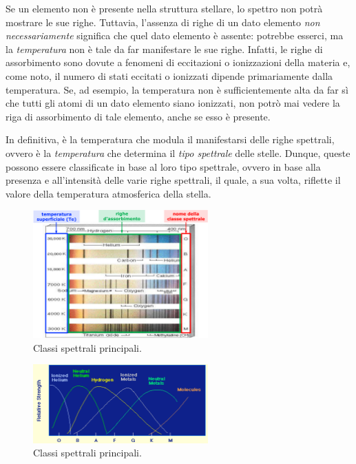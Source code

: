 Se un elemento non è presente nella struttura stellare, lo spettro non potrà mostrare le sue righe. Tuttavia, l'assenza di righe di un dato elemento \emph{non necessariamente} significa che quel dato elemento è assente: potrebbe esserci, ma la \emph{temperatura} non è tale da far manifestare le sue righe. Infatti, le righe di assorbimento sono dovute a fenomeni di eccitazioni o ionizzazioni della materia e, come noto,  il numero di stati eccitati o ionizzati dipende primariamente dalla temperatura. Se, ad esempio, la temperatura non è sufficientemente alta da far sì che tutti gli atomi di un dato elemento siano ionizzati, non potrò mai vedere la riga di assorbimento di tale elemento, anche se esso è presente.

In definitiva, è la temperatura che modula il manifestarsi delle righe spettrali, ovvero è la \emph{temperatura} che determina il \emph{tipo spettrale} delle stelle. Dunque, queste possono essere classificate in base al loro tipo spettrale, ovvero in base alla presenza e all'intensità delle varie righe spettrali, il quale, a sua volta, riflette il valore della temperatura atmosferica della stella.

\begin{figure}
    \centering
    \includegraphics[width=0.6\textwidth]{immagini/classificazione-spettrale-stelle.png}
    \caption{Classi spettrali principali.}
    \label{fig:classificazione-spettrale-stelle}
\end{figure}

\begin{figure}
    \centering
    \includegraphics[width=0.6\textwidth]{immagini/classificazione-spettrale-stelle-2.png}
    \caption{Classi spettrali principali.}
    \label{fig:classificazione-spettrale-stelle-2}
    
\end{figure}

